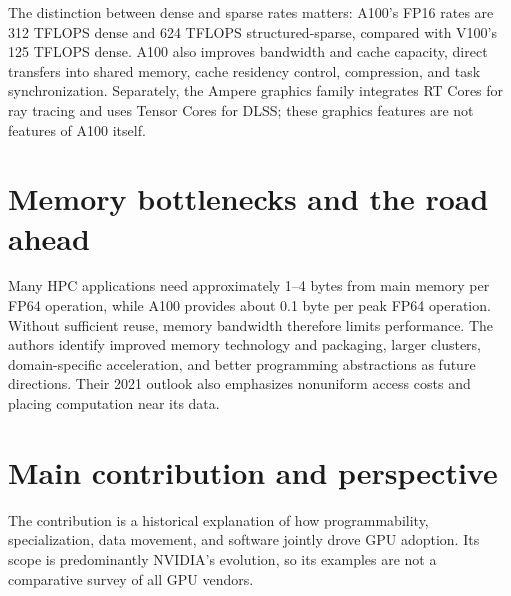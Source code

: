 \documentclass[11pt,a4paper]{article}
\newcommand{\topic}[1]{\section*{#1}}
\begin{document}
The distinction between dense and sparse rates matters: A100's FP16 rates
are 312 TFLOPS dense and 624 TFLOPS structured-sparse, compared with V100's
125 TFLOPS dense. A100 also improves bandwidth and cache capacity, direct
transfers into shared memory, cache residency control, compression, and
task synchronization. Separately, the Ampere graphics family integrates
RT Cores for ray tracing and uses Tensor Cores for DLSS; these graphics
features are not features of A100 itself.

\topic{Memory bottlenecks and the road ahead}
Many HPC applications need approximately 1--4 bytes from main memory per
FP64 operation, while A100 provides about 0.1 byte per peak FP64 operation.
Without sufficient reuse, memory bandwidth therefore limits performance.
The authors identify improved memory technology and packaging, larger
clusters, domain-specific acceleration, and better programming abstractions
as future directions. Their 2021 outlook also emphasizes nonuniform access
costs and placing computation near its data.

\topic{Main contribution and perspective}
The contribution is a historical explanation of how programmability,
specialization, data movement, and software jointly drove GPU adoption.
Its scope is predominantly NVIDIA's evolution, so its examples are not
a comparative survey of all GPU vendors.
\end{document}

